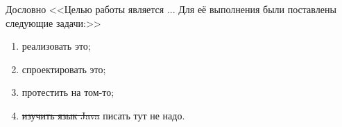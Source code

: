  Дословно <<Целью работы является ... Для её выполнения были поставлены следующие задачи:>>
 \begin{enumerate}
 \item  реализовать это;
 \item  спроектировать это;
 \item  протестить на том-то;
 \item \sout{изучить язык Java} писать тут не надо.
 \end{enumerate}

